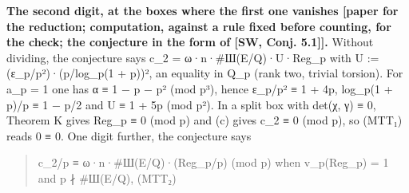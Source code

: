 \documentclass[11pt,a4paper]{article}
\theoremstyle{named}
\begin{document}
\textbf{The second digit, at the boxes where the first one vanishes [paper for the reduction; computation, against a rule fixed before counting, for the check; the conjecture in the form of [SW, Conj. 5.1]].} Without dividing, the conjecture says c\_2 = ω·n·\#Ш(E/Q)·U·Reg\_p with U := (ε\_p/p²)·(p/log\_p(1 + p))², an equality in Q\_p (rank two, trivial torsion). For a\_p = 1 one has α ≡ 1 − p − p² (mod p³), hence ε\_p/p² ≡ 1 + 4p, log\_p(1 + p)/p ≡ 1 − p/2 and U ≡ 1 + 5p (mod p²). In a split box with det(χ, γ) ≡ 0, Theorem K gives Reg\_p ≡ 0 (mod p) and (c) gives c\_2 ≡ 0 (mod p), so (MTT₁) reads 0 ≡ 0. One digit further, the conjecture says

\begin{quote}
c\_2/p ≡ ω·n·\#Ш(E/Q)·(Reg\_p/p) (mod p)  when v\_p(Reg\_p) = 1 and p ∤ \#Ш(E/Q),   (MTT₂)
\end{quote}
\end{document}
